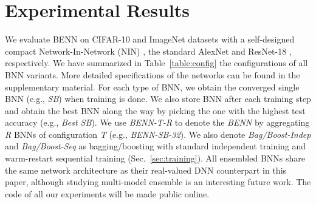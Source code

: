 \documentclass[10pt,twocolumn,letterpaper]{article}
\begin{document}
\section{Experimental Results}
\label{sec:experiments}
We evaluate BENN on CIFAR-10 and ImageNet datasets with a self-designed compact Network-In-Network (NIN) \cite{lin2013network}, the standard AlexNet \cite{krizhevsky2012imagenet} and ResNet-18 \cite{he2016deep}, respectively. We have summarized in Table~\ref{table:config} the configurations of all BNN variants. More detailed specifications of the networks can be found in the supplementary material. For each type of BNN, we obtain the converged single BNN (e.g., \textit{SB}) when training is done. We also store BNN after each training step and obtain the best BNN along the way by picking the one with the highest test accuracy (e.g., \textit{Best SB}). We use \textit{BENN-T-R} to denote the \textit{BENN} by aggregating \textit{R} BNNs of configuration \textit{T} (e.g., \textit{BENN-SB-32}). We also denote \textit{Bag/Boost-Indep} and \textit{Bag/Boost-Seq} as bagging/boosting with standard independent training and warm-restart sequential training (Sec.~\ref{sec:training}). All ensembled BNNs share the same network architecture as their real-valued DNN counterpart in this paper, although studying multi-model ensemble is an interesting future work. The code of all our experiments will be made public online.
\end{document}

